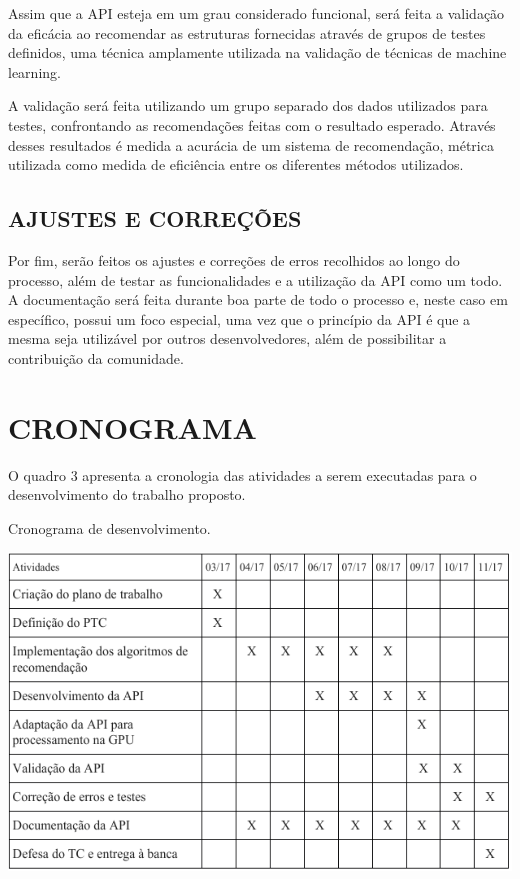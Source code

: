 \documentclass[12pt, openright, oneside, a4paper, brazil]{abntex2}
\begin{document}
Assim que a API esteja em um grau considerado funcional, será feita a validação da eficácia ao recomendar as estruturas fornecidas através de grupos de testes definidos, uma técnica amplamente utilizada na validação de técnicas de machine learning.

A validação será feita utilizando um grupo separado dos  dados utilizados para testes, confrontando as recomendações feitas com o resultado esperado. Através desses resultados é medida a acurácia de um sistema de recomendação, métrica utilizada como medida de eficiência entre os diferentes métodos utilizados.

\section{AJUSTES E CORREÇÕES}

Por fim, serão feitos os ajustes e correções de erros recolhidos ao longo do processo, além de testar as funcionalidades e a utilização da API como um todo. A documentação será feita durante boa parte de todo o processo e, neste caso em específico, possui um foco especial, uma vez que o princípio da API é que a mesma seja utilizável por outros desenvolvedores, além de possibilitar a contribuição da comunidade.

%
%

\chapter{CRONOGRAMA}

O quadro 3 apresenta a cronologia das atividades a serem executadas para o desenvolvimento do trabalho proposto.

\begin{quadro}[h!tp]
	\caption{\label{chronology}Cronograma de desenvolvimento.}
	\begin{center}
		\includegraphics[scale=0.95]{images/chronology.png}
	\end{center}
	\hspace{5.5cm}{Fonte: o autor.}
\end{quadro}
\end{document}
